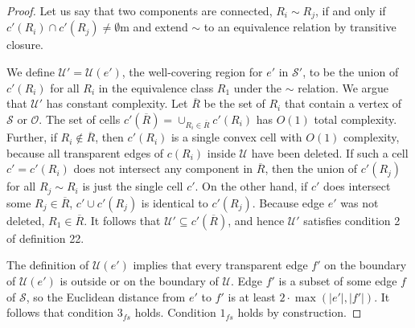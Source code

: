 \begin{proof}

Let us say that two components are connected, $R_i \sim R_j$, if and only if
$c'(R_i) \cap c'(R_j) \neq \emptyset$m and extend $\sim$ to an equivalence
relation by transitive closure.

We define $\mathcal{U}'=\mathcal{U}(e')$, the well-covering region for $e'$ in
$\mathcal{S}'$, to be the union of $c'(R_i)$ for all $R_i$ in the equivalence
class $R_1$ under the $\sim$ relation. We argue that $\mathcal{U}'$ has
constant complexity. Let $\overline{R}$ be the set of $R_i$ that contain a
vertex of $\mathcal{S}$ or $\mathcal{O}$. The set of cells
$c'(\overline{R})=\cup_{R_i\in \overline{R}}c'(R_i)$ has $O(1)$ total
complexity. Further, if $R_i\not\in\overline{R}$, then $c'(R_i)$ is a single
convex cell with $O(1)$ complexity, because all transparent edges of $c(R_i)$
inside $\mathcal{U}$ have been deleted. If such a cell $c'=c'(R_i)$ does not
intersect any component in $\overline{R}$, then the union of $c'(R_j)$ for all
$R_j\sim R_i$ is just the single cell $c'$. On the other hand, if $c'$ does
intersect some $R_j\in\overline{R}$, $c'\cup c'(R_j)$ is identical to
$c'(R_j)$. Because edge $e'$ was not deleted, $R_1\in\overline{R}$. It follows
that $\mathcal{U}'\subseteq c'(\overline{R})$, and hence $\mathcal{U}'$
satisfies condition 2 of definition 22.

The definition of $\mathcal{U}(e')$ implies that every transparent edge $f'$ on
the boundary of $\mathcal{U}(e')$ is outside or on the boundary of
$\mathcal{U}$. Edge $f'$ is a subset of some edge $f$ of $\mathcal{S}$, so the
Euclidean distance from $e'$ to $f'$ is at least $2\cdot \max(|e'|,|f'|)$. It
follows that condition $3_{fs}$ holds. Condition $1_{fs}$ holds by
construction. 


\end{proof}
